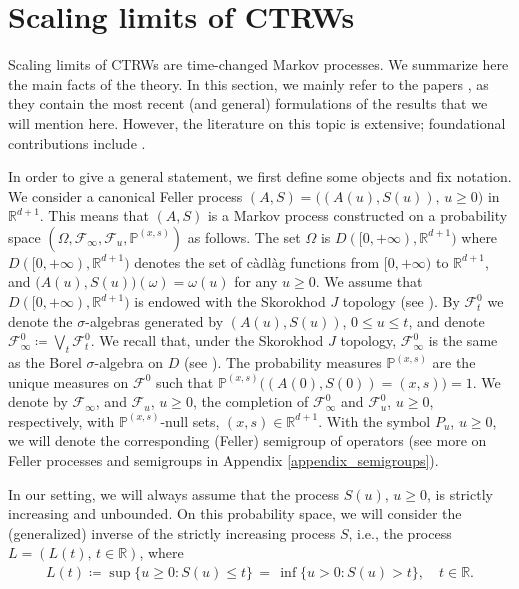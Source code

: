 \documentclass[reqno]{amsart}
\theoremstyle{remark}
\numberwithin{equation}{section} %
\newcommand{\RR}{\mathbb{R}}
\newcommand{\PP}{\mathds{P}}
\newcommand{\1}{\mathds{1}}
\begin{document}
	\section{Scaling limits of CTRWs}
	\label{sec_limit}
	Scaling limits of CTRWs are time-changed Markov processes. We summarize here the main facts of the theory. In this section, we mainly refer to the papers \cite{straka2011lagging, Meerschaert2014}, as they contain the most recent (and general) formulations of the results that we will mention here. However, the literature on this topic is extensive; foundational contributions include \cite{becker2004limit, Meerschaert2004, meerschaert2008triangular, kolokoltsov2009generalized}.
	
	In order to give a general statement, we first define some objects and fix notation.
	We consider a canonical Feller process $(A,S) = \big((A(u), S(u)),\, u \geq 0\big)$ in $\mathbb{R}^{d+1}$. This means that $(A, S)$ is {a Markov process} constructed on a probability space $(\Omega, \mathcal{F}_\infty, \mathcal{F}_u, \PP^{(x,s)})$ as follows. The set $\Omega$ is $D([0, +\infty), \mathbb{R}^{d+1})$ where $D([0, +\infty), \mathbb{R}^{d+1})$ denotes the set of càdlàg functions from $[0, +\infty)$ to $\mathbb{R}^{d+1}$, and $\big(A(u), S(u)\big)(\omega) = \omega(u)$ for any $u \geq 0$. We assume that $D([0, +\infty), \mathbb{R}^{d+1})$ is endowed with the Skorokhod $J$ topology (see \cite[Chapter 6]{jacod2013limit}). By $\mathcal{F}_t^0$ we denote the $\sigma$-algebras generated by $(A(u), S(u))$, $0 \leq u \leq t$, and denote $\mathcal{F}^0_\infty\coloneqq \bigvee_t \mathcal{F}^0_t $. We recall that, under the Skorokhod $J$ topology, $\mathcal{F}_\infty^0$ is the same as the Borel $\sigma$-algebra on $D$ (see \cite[Chapter 6, Theorem 1.14]{jacod2013limit}). The probability measures $\PP^{(x,s)}$ are the unique measures on $\mathcal{F}^0$ such that $\mathds{P}^{(x,s)}\big((A(0), S(0))=(x,s)\big)=1$. We denote by $\mathcal{F}_\infty$, and $\mathcal{F}_u$, $u \geq 0$, the completion of $\mathcal{F}_\infty^0$ and $\mathcal{F}^0_u$, $u \geq 0$, respectively, with $\mathds{P}^{(x,s)}$-null sets, $(x,s)\in \RR^{d+1}$. With the symbol $P_u$, $u \geq 0$, we will denote the corresponding (Feller) semigroup of operators (see more on Feller processes and semigroups in Appendix \ref{appendix_semigroups}).
	
	In our setting, we will always assume that the process $S(u)$, $u\geq 0$, is strictly increasing and unbounded. On this probability space, we will consider the (generalized) inverse of the strictly increasing process $S$, i.e., the process $L= (L(t),\, t \in \mathbb{R})$, where
	\begin{align}\label{defL}
		L(t) \coloneqq {\sup\{ u \geq 0: S(u)\leq t  \}  \, = \, } \inf \{ u>0 : S(u) > t \},\quad t\in\RR.
	\end{align}
	
\end{document}
